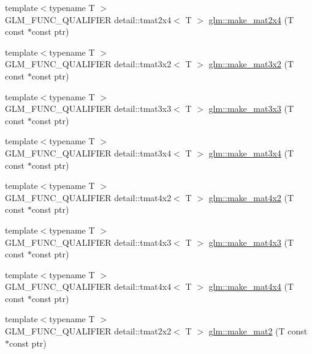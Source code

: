 \begin{DoxyCompactItemize}
\item 
{\footnotesize template$<$typename T $>$ }\\G\+L\+M\+\_\+\+F\+U\+N\+C\+\_\+\+Q\+U\+A\+L\+I\+F\+I\+E\+R detail\+::tmat2x4$<$ T $>$ \hyperlink{group__gtc__type__ptr_gaab3df4b27b38505f1413f507ebc43d18}{glm\+::make\+\_\+mat2x4} (T const $\ast$const ptr)
\item 
{\footnotesize template$<$typename T $>$ }\\G\+L\+M\+\_\+\+F\+U\+N\+C\+\_\+\+Q\+U\+A\+L\+I\+F\+I\+E\+R detail\+::tmat3x2$<$ T $>$ \hyperlink{group__gtc__type__ptr_ga8764d696bd4dfb91d689ca196414b36b}{glm\+::make\+\_\+mat3x2} (T const $\ast$const ptr)
\item 
{\footnotesize template$<$typename T $>$ }\\G\+L\+M\+\_\+\+F\+U\+N\+C\+\_\+\+Q\+U\+A\+L\+I\+F\+I\+E\+R detail\+::tmat3x3$<$ T $>$ \hyperlink{group__gtc__type__ptr_ga56ddd61c1c64dba464e392b2c2011226}{glm\+::make\+\_\+mat3x3} (T const $\ast$const ptr)
\item 
{\footnotesize template$<$typename T $>$ }\\G\+L\+M\+\_\+\+F\+U\+N\+C\+\_\+\+Q\+U\+A\+L\+I\+F\+I\+E\+R detail\+::tmat3x4$<$ T $>$ \hyperlink{group__gtc__type__ptr_gaae2b48f5109461f13f63ccf5b4cde672}{glm\+::make\+\_\+mat3x4} (T const $\ast$const ptr)
\item 
{\footnotesize template$<$typename T $>$ }\\G\+L\+M\+\_\+\+F\+U\+N\+C\+\_\+\+Q\+U\+A\+L\+I\+F\+I\+E\+R detail\+::tmat4x2$<$ T $>$ \hyperlink{group__gtc__type__ptr_ga3717ecbb38c8a24043ee17bdff94bca5}{glm\+::make\+\_\+mat4x2} (T const $\ast$const ptr)
\item 
{\footnotesize template$<$typename T $>$ }\\G\+L\+M\+\_\+\+F\+U\+N\+C\+\_\+\+Q\+U\+A\+L\+I\+F\+I\+E\+R detail\+::tmat4x3$<$ T $>$ \hyperlink{group__gtc__type__ptr_gae91cc925c4154c5fe4ef1fc7da96a9a8}{glm\+::make\+\_\+mat4x3} (T const $\ast$const ptr)
\item 
{\footnotesize template$<$typename T $>$ }\\G\+L\+M\+\_\+\+F\+U\+N\+C\+\_\+\+Q\+U\+A\+L\+I\+F\+I\+E\+R detail\+::tmat4x4$<$ T $>$ \hyperlink{group__gtc__type__ptr_gaa287485a3978d319e60a1cadd8a1c139}{glm\+::make\+\_\+mat4x4} (T const $\ast$const ptr)
\item 
{\footnotesize template$<$typename T $>$ }\\G\+L\+M\+\_\+\+F\+U\+N\+C\+\_\+\+Q\+U\+A\+L\+I\+F\+I\+E\+R detail\+::tmat2x2$<$ T $>$ \hyperlink{group__gtc__type__ptr_gafd896ef261762a6ab412b61181d5ecae}{glm\+::make\+\_\+mat2} (T const $\ast$const ptr)

\end{DoxyCompactItemize}
